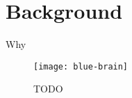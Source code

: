 \section{Background}

\begin{frame}{Why}

\begin{figure}
\texttt{[image: blue-brain]}
\caption{TODO \cite{trader_2014}}
\end{figure}

\end{frame}
